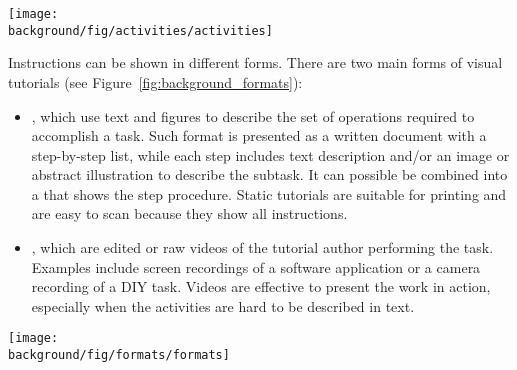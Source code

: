 \begin{figure*}[t]
  \centering
  \begin{minipage}{\textwidth}
  \texttt{[image: \\background/fig/activities/activities]}
  \caption[activities]{Example activities in tutorial domains:
  a) image manipulations using a software application
  \footnote{Photoshop Playbook: Selective Focus \url{https://youtu.be/Wh3ahxqDnyw}},
  b) wrapping a gift, a DIY task
  \footnote{One Kings Lane: How to Wrap the Perfect Gift \url{https://youtu.be/Me3ykrZobJE}},
  c) cooking, an everyday activity
  \footnote{Slow-cooked black treacle ham \url{http://www.bbc.co.uk/food/recipes/slow-cooked_black_21152}}, and
  d) ballet dancing in sports
  \footnote{Ballet 101: How to Do the Fouette in Ballet Dancing \url{https://youtu.be/DzqQNlaahjs}}.
  }
  \label{fig:background_activities}
  \end{minipage}
\end{figure*}


Instructions can be shown in different forms. There are two main forms of visual tutorials (see Figure~\ref{fig:background_formats}):
\begin{itemize}
  \itemsep -2pt
  \item {}, which use text and figures to describe the set of operations required to accomplish a task. Such format is presented as a written document with a step-by-step list, while each step includes text description and/or an image or abstract illustration to describe the subtask. It can possible be combined into a  that shows the step procedure. Static tutorials are suitable for printing and are easy to scan because they show all instructions.
  \item {}, which are edited or raw videos of the tutorial author performing the task. Examples include screen recordings of a software application or a camera recording of a DIY task. Videos are effective to present the work in action, especially when the activities are hard to be described in text.
\end{itemize}

\begin{figure*}[th!]
  \centering
  \begin{minipage}{\textwidth}
  \texttt{[image: \\background/fig/formats/formats]}
  \caption[formats]{Major tutorial forms:
  a) Step-by-step static tutorials show a list of steps, each with text and figure(s) that describe a subtask
  \footnote{Combine photos on the go \url{https://helpx.adobe.com/mobile-apps/how-to/combine-photos-photoshop-mix.html}}, and
  b) video tutorials show an author performing the task, which can be reviewed via a video player
  \footnote{Change the color of an object \url{https://helpx.adobe.com/photoshop/how-to/change-color-object-photoshop.html}}.
  }
  \label{fig:background_formats}
  \end{minipage}
\end{figure*}

